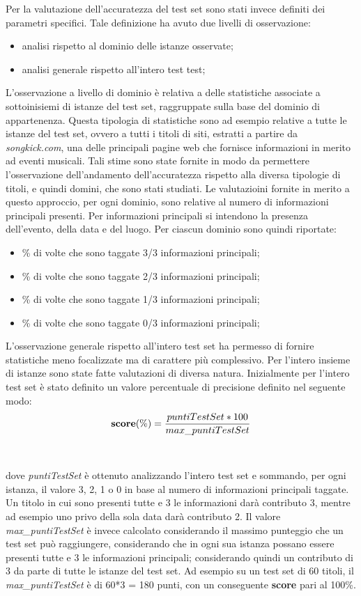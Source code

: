 \documentclass[a4paper]{report}
\begin{document}
Per la valutazione dell'accuratezza del test set sono stati invece definiti dei parametri specifici. Tale definizione ha avuto due livelli di osservazione:
\begin{itemize}
\item analisi rispetto al dominio delle istanze osservate;
\item analisi generale rispetto all'intero test test;
\end{itemize}
L'osservazione a livello di dominio è relativa a delle statistiche associate a sottoinisiemi di istanze del test set, raggruppate sulla base del dominio di appartenenza. Questa tipologia di statistiche sono ad esempio relative a tutte le istanze del test set, ovvero a tutti i titoli di siti, estratti a partire da \textit{songkick.com}, una delle principali pagine web che fornisce informazioni in merito ad eventi musicali. Tali stime sono state fornite in modo da permettere l'osservazione dell'andamento dell'accuratezza rispetto alla diversa tipologie di titoli, e quindi domini, che sono stati studiati. Le valutazioini fornite in merito a questo approccio, per ogni dominio, sono relative al numero di informazioni principali presenti. Per informazioni principali si intendono la presenza dell'evento, della data e del luogo. Per ciascun dominio sono quindi riportate:
\begin{itemize}
\item \% di volte che sono taggate 3/3 informazioni principali;
\item \% di volte che sono taggate 2/3 informazioni principali;
\item \% di volte che sono taggate 1/3 informazioni principali;
\item \% di volte che sono taggate 0/3 informazioni principali;
\end{itemize}
L'osservazione generale rispetto all'intero test set ha permesso di fornire statistiche meno focalizzate ma di carattere più complessivo. Per l'intero insieme di istanze sono state fatte valutazioni di diversa natura. Inizialmente per l'intero test set è stato definito un valore percentuale di precisione definito nel seguente modo: \\
$${\bf score (\%)}=\frac{puntiTestSet*100}{max\_puntiTestSet}$$ \\\\
dove \textit{puntiTestSet} è ottenuto analizzando l'intero test set e sommando, per ogni istanza, il valore 3, 2, 1 o 0 in base al numero di informazioni principali taggate. Un titolo in cui sono presenti tutte e 3 le informazioni darà contributo 3, mentre ad esempio uno privo della sola data darà contributo 2. Il valore \textit{max\_puntiTestSet} è invece calcolato considerando il massimo punteggio che un test set può raggiungere, considerando che in ogni sua istanza possano essere presenti tutte e 3 le informazioni principali; considerando quindi un contributo di 3 da parte di tutte le istanze del test set. Ad esempio su un test set di 60 titoli, il \textit{max\_puntiTestSet} è di 60*3 = 180 punti, con un conseguente \textbf{score} pari al 100\%. \\
\end{document}
